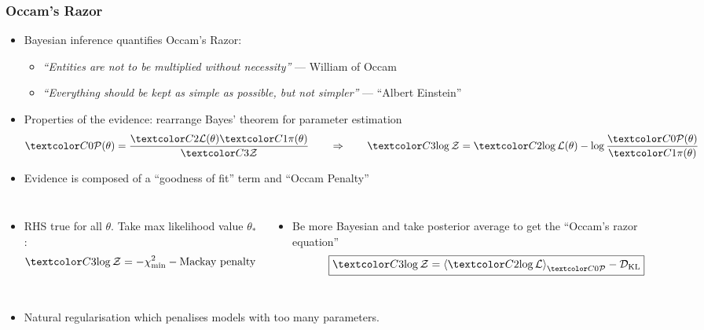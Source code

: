 \documentclass[aspectratio=169, handout]{beamer}
\newcommand{\av}[2][]{\left\langle #2\right\rangle_{#1}}
\begin{document}
\begin{frame}
    \frametitle{Occam's Razor~}
    \begin{itemize}
        \item Bayesian inference quantifies Occam's Razor:
            \begin{itemize}
                \item \textit{``Entities are not to be multiplied without necessity''} \hfill --- William of Occam
                \item \textit{``Everything should be kept as simple as possible, but not simpler''} \hfill --- ``Albert Einstein''
            \end{itemize}
        \item Properties of the evidence: rearrange Bayes' theorem for parameter estimation
            \[\C[0]{\mathcal{P}(\theta)} = \frac{\C[2]{\mathcal{L}(\theta)} \C[1]{\pi(\theta)}}{\C[3]{\mathcal{Z}}} \qquad\Rightarrow\qquad \C[3]{\log \mathcal{Z}} = \C[2]{\log\mathcal{L}(\theta)} - \log \frac{\C[0]{\mathcal{P}(\theta)}}{\C[1]{\pi(\theta)}} \]  
        \item Evidence is composed of a ``goodness of fit'' term  and ``Occam Penalty''
    \end{itemize}
    \begin{columns}[t]
    \begin{itemize}
        \item RHS true for all $\theta$. Take max likelihood value $\theta_*$:
            \[
                \C[3]{\log \mathcal{Z}} = -\chi_\mathrm{min}^2 - \text{Mackay penalty}
            \]
    \end{itemize}
    \begin{itemize}
        \item Be more Bayesian and take posterior average to get the ``Occam's razor equation''
            \[
                \boxed{
                    \C[3]{\log \mathcal{Z}} = \av[{\C[0]{\mathcal{P}}}]{\C[2]{\log\mathcal{L}}} - \mathcal{D}_\mathrm{KL}
            }
            \]
    \end{itemize}
    \end{columns}
    \vfill
    \begin{itemize}
        \item Natural regularisation which penalises models with too many parameters.
    \end{itemize}
\end{frame}
\end{document}
